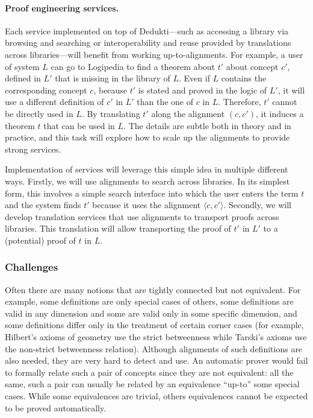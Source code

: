 \paragraph*{Proof engineering services.}
Each service implemented on top of Dedukti---such as accessing a
library via browsing and searching or interoperability and reuse
provided by translations across libraries---will benefit from working
up-to-alignments. For example, a user of system $L$ can go to
Logipedia to find a theorem about $t'$ about concept $c'$, defined in
$L'$ that is missing in the library of $L$. Even if $L$ contains the
corresponding concept $c$, because $t'$ is stated and proved in the
logic of $L'$, it will use a different definition of $c'$ in $L'$ than
the one of $c$ in $L$.  Therefore, $t'$ cannot be directly used in
$L$. By translating $t'$ along the alignment $(c,c')$, it induces a
theorem $t$ that can be used in $L$. The details are subtle both in
theory and in practice, and this task will explore how to scale up the
alignments to provide strong services.

Implementation of services will leverage this simple idea in multiple
different ways. Firstly, we will use alignments to search across
libraries. In its simplest form, this involves a simple search
interface into which the user enters the term $t$ and the system finds
$t'$ because it uses the alignment $\langle c,c'\rangle$. Secondly, we
will develop translation services that use alignments to transport
proofs across libraries. This translation will allow transporting the
proof of $t'$ in $L'$ to a (potential) proof of $t$ in $L$.


\subsubsection*{Challenges}

Often there are many notions that are tightly connected but not
equivalent.
%
For example, some definitions are only special cases of others,
some definitions are valid in any dimension and some
are valid only in some specific dimension, and some definitions differ
only in the treatment of certain corner cases (for example, Hilbert's axioms of
geometry use the strict betweenness while Tarski's axioms use the
non-strict betweenness relation).  Although alignments of such
definitions are also needed, they are very hard to detect and use. An
automatic prover would fail to formally relate such a pair of concepts
since they are not equivalent: all the same, such a pair can usually
be related by an equivalence ``up-to'' some special cases.  While some
equivalences are trivial, others equivalences cannot be expected to be
proved automatically.

